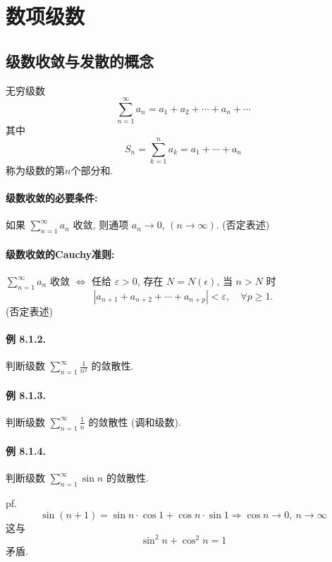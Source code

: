 \section{数项级数}

\subsection{级数收敛与发散的概念}

无穷级数
\[
\sum_{n=1}^{\infty}a_{n}=a_{1}+a_{2}+\cdots+a_{n}+\cdots
\]
其中
\[
S_{n}=\sum_{k=1}^{n}a_{k}=a_{1}+\cdots+a_{n}
\]
称为级数的第$n$个部分和.

\paragraph{级数收敛的必要条件:}

如果 $\sum_{n=1}^{\infty}a_{n}$ 收敛, 则通项 $a_{n}\rightarrow0$, $(n\rightarrow\infty)$.
(否定表述)

\paragraph{级数收敛的Cauchy准则:}

$\sum_{n=1}^{\infty}a_{n}$ 收敛 $\Longleftrightarrow$ 任给 $\varepsilon>0$,
存在 $N=N(\epsilon)$, 当 $n>N$ 时 
\[
\left|a_{n+1}+a_{n+2}+\cdots+a_{n+p}\right|<\varepsilon,\quad\forall p\geqslant1.
\]
(否定表述)

\paragraph{例 8.1.2. }

判断级数 $\sum_{n=1}^{\infty}\frac{1}{n^{2}}$ 的敛散性.

\paragraph{例 8.1.3. }

判断级数 $\sum_{n=1}^{\infty}\frac{1}{n}$ 的敛散性 (调和级数).

\paragraph{例 8.1.4. }

判断级数 $\sum_{n=1}^{\infty}\sin n$ 的敛散性.

pf. 
\[
\sin(n+1)=\sin n\cdot\cos1+\cos n\cdot\sin1\Longrightarrow\cos n\to0,\ n\to\infty
\]
这与
\[
\sin^{2}n+\cos^{2}n=1
\]
矛盾.


